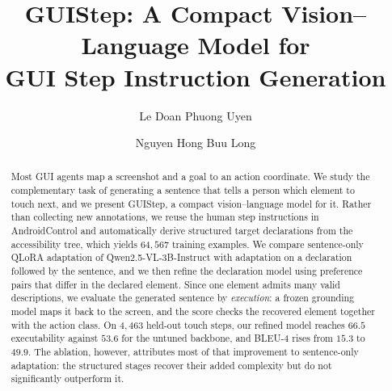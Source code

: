 \documentclass[runningheads,a4paper]{llncs}
\begin{document}
\pagestyle{empty}

\title{GUIStep: A Compact Vision--Language Model for\\
GUI Step Instruction Generation}


\author{Le Doan Phuong Uyen \and Nguyen Hong Buu Long}



\maketitle
\thispagestyle{empty}

\begin{abstract}
Most GUI agents map a screenshot and a goal to an action coordinate. We study the complementary
task of generating a sentence that tells a person which element to touch next, and we present
GUIStep, a compact vision--language model for it. Rather than collecting new annotations, we
reuse the human step instructions in AndroidControl and automatically derive structured target
declarations from the accessibility tree, which yields $64{,}567$ training examples. We compare
sentence-only QLoRA adaptation of Qwen2.5-VL-3B-Instruct with adaptation on a declaration followed
by the sentence, and we then refine the declaration model using preference pairs that differ in
the declared element. Since one element admits many valid descriptions, we evaluate the generated
sentence by \emph{execution}: a frozen grounding model maps it back to the screen, and the score
checks the recovered element together with the action class. On $4{,}463$ held-out touch steps,
our refined model reaches $66.5$ executability against $53.6$ for the untuned backbone, and
BLEU-4 rises from $15.3$ to $49.9$. The ablation, however, attributes most of that improvement to
sentence-only adaptation: the structured stages recover their added complexity but do not
significantly outperform it.
\end{abstract}

\end{document}
